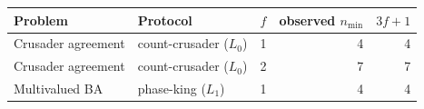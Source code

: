 \begin{tabular}{@{}llrrr@{}}
\toprule
Problem & Protocol & $f$ & observed $n_{\min}$ & $3f+1$\\
\midrule
Crusader agreement & count-crusader ($L_0$) & 1 & 4 & 4\\
Crusader agreement & count-crusader ($L_0$) & 2 & 7 & 7\\
Multivalued BA & phase-king ($L_1$) & 1 & 4 & 4\\
\bottomrule
\end{tabular}
